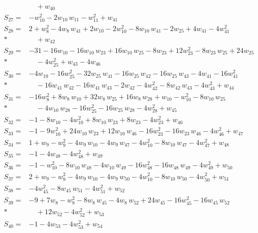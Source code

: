 \begin{align*}
&\quad  + w_{40} \\[2pt]
S_{27}={}& -w_{10}^{2} - 2w_{10}\,w_{11} - w_{11}^{2} + w_{41} \\[2pt]
S_{28}={}& 2 + w_{8}^{2} - 4w_{8}\,w_{41} + 2w_{10} - 2w_{10}^{2} - 8w_{10}\,w_{41} - 2w_{25} + 4w_{41} - 4w_{41}^{2} \\*
&\quad  + w_{42} \\[2pt]
S_{29}={}& -31 - 16w_{10} - 16w_{10}\,w_{23} + 16w_{10}\,w_{25} - 8w_{23} + 12w_{23}^{2} - 8w_{23}\,w_{25} + 24w_{25} \\*
&\quad  - 4w_{25}^{2} + w_{43} - 4w_{46} \\[2pt]
S_{30}={}& -4w_{10} - 16w_{25}^{2} - 32w_{25}\,w_{41} - 16w_{25}\,w_{42} - 16w_{25}\,w_{43} - 4w_{41} - 16w_{41}^{2} \\*
&\quad  - 16w_{41}\,w_{42} - 16w_{41}\,w_{43} - 2w_{42} - 4w_{42}^{2} - 8w_{42}\,w_{43} - 4w_{43}^{2} + w_{44} \\[2pt]
S_{31}={}& -16w_{8}^{2} + 8w_{8}\,w_{10} + 32w_{8}\,w_{25} + 16w_{8}\,w_{28} + w_{10} - w_{10}^{2} - 8w_{10}\,w_{25} \\*
&\quad  - 4w_{10}\,w_{28} - 16w_{25}^{2} - 16w_{25}\,w_{28} - 4w_{28}^{2} + w_{45} \\[2pt]
S_{32}={}& -1 - 8w_{10} - 4w_{10}^{2} + 8w_{10}\,w_{23} + 8w_{23} - 4w_{23}^{2} + w_{46} \\[2pt]
S_{33}={}& -1 - 9w_{10}^{2} + 24w_{10}\,w_{23} + 12w_{10}\,w_{46} - 16w_{23}^{2} - 16w_{23}\,w_{46} - 4w_{46}^{2} + w_{47} \\[2pt]
S_{34}={}& 1 + w_{9} - w_{9}^{2} - 4w_{9}\,w_{10} - 4w_{9}\,w_{47} - 4w_{10}^{2} - 8w_{10}\,w_{47} - 4w_{47}^{2} + w_{48} \\[2pt]
S_{35}={}& -1 - 4w_{48} - 4w_{48}^{2} + w_{49} \\[2pt]
S_{36}={}& -1 - w_{10}^{2} - 8w_{10}\,w_{48} - 4w_{10}\,w_{49} - 16w_{48}^{2} - 16w_{48}\,w_{49} - 4w_{49}^{2} + w_{50} \\[2pt]
S_{37}={}& 2 + w_{9} - w_{9}^{2} - 4w_{9}\,w_{10} - 4w_{9}\,w_{50} - 4w_{10}^{2} - 8w_{10}\,w_{50} - 4w_{50}^{2} + w_{51} \\[2pt]
S_{38}={}& -4w_{45}^{2} - 8w_{45}\,w_{51} - 4w_{51}^{2} + w_{52} \\[2pt]
S_{39}={}& -9 + 7w_{8} - w_{8}^{2} - 8w_{8}\,w_{45} - 4w_{8}\,w_{52} + 24w_{45} - 16w_{45}^{2} - 16w_{45}\,w_{52} \\*
&\quad  + 12w_{52} - 4w_{52}^{2} + w_{53} \\[2pt]
S_{40}={}& -1 - 4w_{53} - 4w_{53}^{2} + w_{54} \\[2pt]

\end{align*}
